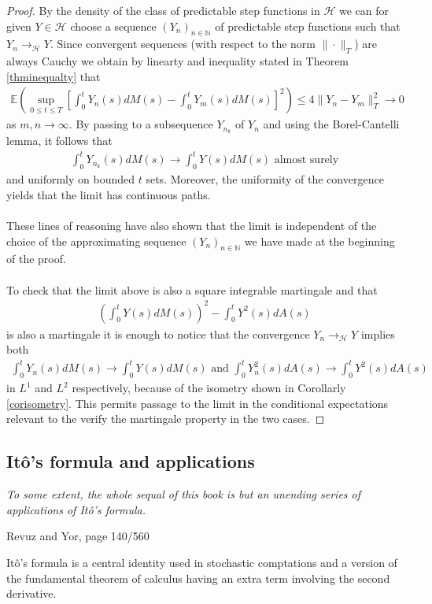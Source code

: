 \documentclass[11pt,a4paper, final]{article}
\begin{document}
\begin{proof}
By the density of the class of predictable step functions in $\mathcal{H}$ we can  for given $Y \in \mathcal{H}$ choose a sequence $(Y_n)_{n \in \mathbb{N}}$ of predictable step functions such that $Y_n \to_\mathcal{H} Y$. Since convergent sequences (with respect to the norm $\| \cdot \|_T$) are always Cauchy we obtain by linearty and inequality stated in Theorem \ref{thminequalty} that
\begin{align*}
\mathbb{E} \left( \sup_{0 \leq t \leq T} \left[ \int_0^t Y_n(s) dM(s) - \int_0^t Y_m(s) dM(s) \right]^2 \right) \leq 4 \| Y_n -Y_m \|_T^2 \to 0 
\end{align*}
as $m,n \to \infty$. By passing to a subsequence $Y_{n_k}$ of $Y_n$ and using the Borel-Cantelli lemma, it follows that \begin{align*}
\int_0^t Y_{n_k} (s) dM(s) \to \int_0^t Y(s) dM(s) \text{ almost surely}
\end{align*}
and uniformly on bounded $t$ sets. Moreover, the uniformity of the convergence yields that the limit has continuous paths. 
\\\\
These lines of reasoning have also shown that the limit is independent of the choice of the approximating sequence $(Y_n)_{n \in \mathbb{N}}$ we have made at the beginning of the proof. 
\\\\
To check that the limit above is also a square integrable martingale and that 
\begin{align*}
\left( \int_0^t Y(s) dM(s) \right)^2 - \int_0^t Y^2(s) dA(s)
\end{align*}
is also a martingale it is enough to notice that the convergence $Y_n \to_\mathcal{H} Y$ implies both
\begin{align*}
\int_0^t Y_n(s) dM(s) \to \int_0^t Y(s) dM(s) \text{ and } \int_0^t Y_n^2(s)dA(s) \to \int_0^t Y^2(s) dA(s)
\end{align*}
in $L^1$ and $L^2$ respectively, because of the isometry shown in Corollarly \ref{corisometry}. This permits passage to the limit in the conditional expectations relevant to the verify the martingale property in the two cases. 
\end{proof}
\newpage
\subsection{Itô's formula and applications}
\epigraph{\textit{To some extent, the whole sequal of this book is but an unending series of applications of Itô's formula.}}{Revuz and Yor, page 140/560}
\noindent Itô's formula is a central identity used in stochastic comptations and a version of the fundamental theorem of calculus having an extra term involving the second derivative. 
\end{document}
